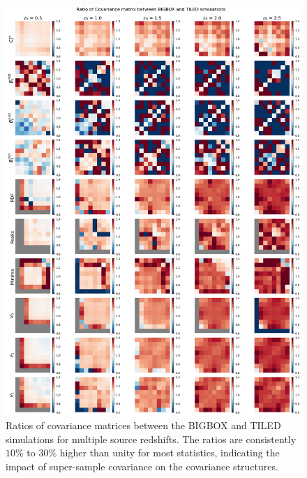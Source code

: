 \begin{figure}[p]
    \centering
    \includegraphics[width=\textwidth]{figures/results/cov_ratio.png}
    \caption[Ratios of Covariance Matrices between BIGBOX and TILED Simulations]{Ratios of covariance matrices between the BIGBOX and TILED simulations for multiple source redshifts. The ratios are consistently $10\%$ to $30\%$ higher than unity for most statistics, indicating the impact of super-sample covariance on the covariance structures.}
    \label{fig:cov_ratio_main}
\end{figure}

